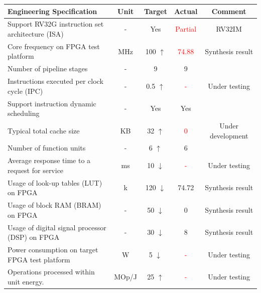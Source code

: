 \begin{table}[!htp]
    \centering
    \resizebox{\textwidth}{!} {
    \begin{tabular}{lcccc}
        \hline
        \textbf{Engineering Specification} & \textbf{Unit} & \textbf{Target} & \textbf{Actual} & \textbf{Comment} \\
        \hline
        Support RV32G instruction set architecture (ISA) & -     & Yes              & \textcolor{red}{Partial}  & RV32IM            \\
        Core frequency on FPGA test platform             & MHz   & 100 $\uparrow$   & \textcolor{red}{74.88}    & Synthesis result  \\ 
        Number of pipeline stages                        & -     & 9                & 9                         &                   \\
        Instructions executed per clock cycle (IPC)      & -     & 0.5 $\uparrow$   & \textcolor{red}{-}        & Under testing     \\
        Support instruction dynamic scheduling           & -     & Yes              & Yes                       &                   \\
        Typical total cache size                         & KB    & 32 $\uparrow$    & \textcolor{red}{0}        & Under development \\
        Number of function units                         & -     & 6 $\uparrow$     & 6                         &                   \\
        Average response time to a request for service   & ms    & 10 $\downarrow$  & \textcolor{red}{-}        & Under testing     \\
        Usage of look-up tables (LUT) on FPGA            & k     & 120 $\downarrow$ & 74.72                     & Synthesis result  \\
        Usage of block RAM (BRAM) on FPGA                & -     & 50 $\downarrow$  & 0                         & Synthesis result  \\
        Usage of digital signal processor (DSP) on FPGA  & -     & 30 $\downarrow$  & 8                         & Synthesis result  \\
        Power consumption on target FPGA test platform   & W     & 5 $\downarrow$   & \textcolor{red}{-}        & Under testing     \\
        Operations processed within unit energy.         & MOp/J & 25 $\uparrow$    & \textcolor{red}{-}        & Under testing     \\

\end{tabular}}
\end{table}
